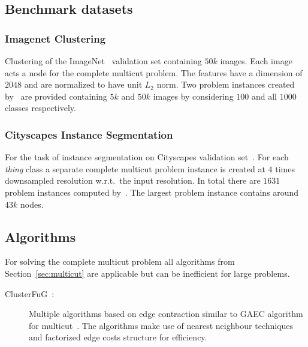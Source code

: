 \subsection{Benchmark datasets}

\subsubsection{Imagenet Clustering}
Clustering of the ImageNet~\cite{deng2009imagenet} validation set containing $50k$ images. Each image acts a node for the complete multicut problem. The features have a dimension of $2048$ and are normalized to have unit $L_2$ norm. Two problem instances created by~\cite{aabbas23_clusterfug} are provided containing $5k$ and $50k$ images by considering $100$ and all $1000$ classes respectively. 

\subsubsection{Cityscapes Instance Segmentation}
For the task of instance segmentation on Cityscapes validation set~\cite{cordts2016cityscapes}. For each \textit{thing} class a separate complete multicut problem instance is created at $4$ times downsampled resolution w.r.t.\ the input resolution. 
In total there are $1631$ problem instances computed by~\cite{aabbas23_clusterfug}. The largest problem instance contains around $43k$ nodes. 

\subsection{Algorithms}
For solving the complete multicut problem all algorithms from Section~\ref{sec:multicut} are applicable but can be inefficient for large problems. 
\begin{description}
\item[ClusterFuG~\cite{aabbas23_clusterfug}:] Multiple algorithms based on edge contraction similar to GAEC algorithm for multicut~\cite{keuper2015efficient}. The algorithms make use of nearest neighbour techniques and factorized edge costs structure for efficiency.
\end{description}
